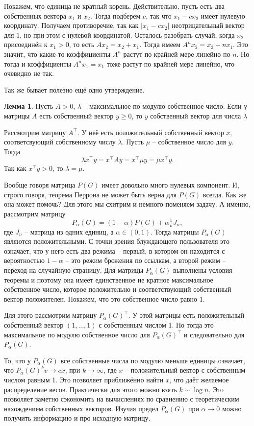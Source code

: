 \documentclass[10pt,a4paper,oneside]{book}
\theoremstyle{definition}
\newtheorem{lem}{Лемма}
\def\lm{\begin{lem}}
\def\elm{\end{lem}}
\begin{document}
Покажем, что единица не кратный корень. Действительно, пусть есть два собственных вектора $x_1$ и $x_2$. Тогда подберём $c$, так что $x_1-cx_2$ имеет нулевую координату. Получаем противоречие, так как $|x_1-cx_2|$ неотрицательный вектор для 1, но при этом с нулевой координатой. Осталось разобрать случай, когда $x_2$ присоединён к $x_1>0$, то есть $Ax_2=x_2+x_1$. Тогда имеем $A^nx_2=x_2 +nx_1$. Это значит, что какие-то коэффициенты $A^n$ растут по крайней мере линейно по $n$. Но тогда и коэффициенты $A^nx_1=x_1$ тоже растут по крайней мере линейно, что очевидно не так.
\endproof

Так же бывает полезно ещё одно утверждение. 
\lm Пусть $A>0$, $\lambda$ -- максимальное по модулю собственное число. Если у матрицы $A$ есть собственный вектор $y\geq 0$, то $y$ собственный вектор для числа $\lambda$
\elm
\proof Рассмотрим матрицу $A^{\top}$. У неё есть положительный  собственный вектор $x$, соответсвующий собственному числу $\lambda$. Пусть $\mu$ -- собственное число для $y$. Тогда 
$$\lambda x^{\top}y= x^{\top}Ay=x^{\top}\mu y=\mu x^{\top}y.$$
Так как $x^{\top}y >0$, то $\lambda=\mu$.
\endproof


Вообще говоря матрица $P(G)$ имеет довольно много нулевых компонент. И, строго говоря, теорема Перрона не может быть верна для $P(G)$ всегда. Как же она может помочь? Для этого мы схитрим и немного поменяем задачу. А именно, рассмотрим матрицу $$P_{\alpha}(G)=(1-\alpha) P(G) + \alpha\tfrac{1}{n}J_n,$$
где $J_n$ -- матрица из одних единиц, а $\alpha \in (0,1)$. Тогда матрицы $P_{\alpha}(G)$ являются положительными. С точки зрения блуждающего пользователя это означает, что у него есть два режима -- первый, в котором он находится с вероятностью $1-\alpha$ -- это режим брожения по ссылкам, а второй режим -- переход на случайную страницу. Для матрицы $P_{\alpha}(G)$ выполнены условия теоремы и поэтому она имеет единственное не кратное максимальное собственное число, которое положительно и соответствующий собственный вектор положителен. Покажем, что это собственное число равно 1.

Для этого рассмотрим матрицу $P_{\alpha}(G)^{\top}$. У этой матрицы есть положительный собственный вектор $(1,\dots,1)$ с собственным числом 1. Но тогда это максимальное по модулю собственное число для $P_{\alpha}(G)^{\top}$ и следовательно для $P_{\alpha}(G)$. 

То, что у $P_{\alpha}(G)$ все собственные числа по модулю меньше единицы означает, что $P_{\alpha}(G)^kv \to cx$, при $k \to \infty$, где $x$ -- положительный вектор с собственным числом равным 1. Это позволяет приближённо найти $x$, что даёт желаемое распределение весов. Практически для этого можно взять $k\sim \log n$. Это позволяет заметно сэкономить на вычислениях по сравнению с теоретическим нахождением собственных векторов. Изучая предел $P_{\alpha}(G)$ при $\alpha \to 0$ можно получить информацию и про исходную матрицу.
\end{document}
